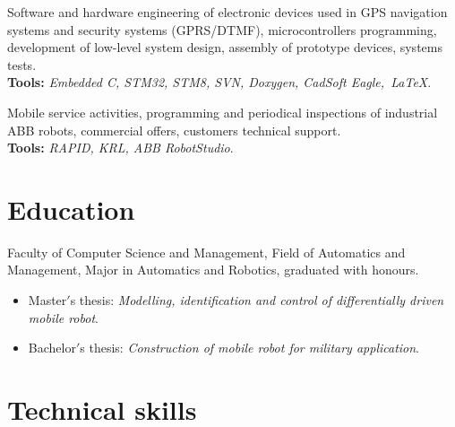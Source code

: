 \documentclass[11pt,a4paper,sans]{moderncv} %
\begin{document}
{Software and hardware engineering of electronic devices used in GPS navigation systems and security systems
(GPRS/DTMF), microcontrollers programming, development of low-level system design, assembly of prototype
devices, systems tests. \\ \textbf{Tools:} \textit{Embedded C, STM32, STM8, SVN, Doxygen, CadSoft Eagle,~\LaTeX}.}

{Mobile service activities, programming and periodical inspections of industrial ABB robots, commercial
offers, customers technical support. \\ \textbf{Tools:} \textit{RAPID, KRL, ABB RobotStudio}.}



\section{Education}

{Faculty of Computer Science and Management, Field of Automatics and Management, Major in Automatics and Robotics,
graduated with honours.
\begin{itemize}
\item Master$'$s thesis: \textit{Modelling, identification and control of differentially driven mobile robot}.
\item Bachelor$'$s thesis: \textit{Construction of mobile robot for military application}.
\end{itemize}}



\section{Technical skills}

\end{document}
